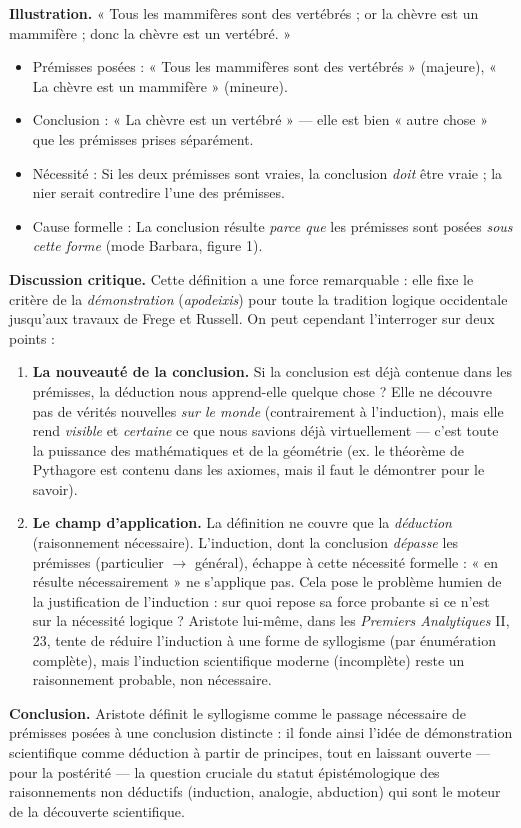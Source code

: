 \documentclass[11pt]{article}
\begin{document}
\begin{exoresolu}
\textbf{Illustration.} « Tous les mammifères sont des vertébrés ; or la chèvre est un mammifère ; donc la chèvre est un vertébré. »
\begin{itemize}
\item Prémisses posées : « Tous les mammifères sont des vertébrés » (majeure), « La chèvre est un mammifère » (mineure).
\item Conclusion : « La chèvre est un vertébré » — elle est bien « autre chose » que les prémisses prises séparément.
\item Nécessité : Si les deux prémisses sont vraies, la conclusion \emph{doit} être vraie ; la nier serait contredire l'une des prémisses.
\item Cause formelle : La conclusion résulte \emph{parce que} les prémisses sont posées \emph{sous cette forme} (mode Barbara, figure 1).
\end{itemize}

\textbf{Discussion critique.}
Cette définition a une force remarquable : elle fixe le critère de la \emph{démonstration} (\emph{apodeixis}) pour toute la tradition logique occidentale jusqu'aux travaux de Frege et Russell.
On peut cependant l'interroger sur deux points :
\begin{enumerate}
\item \textbf{La nouveauté de la conclusion.} Si la conclusion est déjà contenue dans les prémisses, la déduction nous apprend-elle quelque chose ? Elle ne découvre pas de vérités nouvelles \emph{sur le monde} (contrairement à l'induction), mais elle rend \emph{visible} et \emph{certaine} ce que nous savions déjà virtuellement — c'est toute la puissance des mathématiques et de la géométrie (ex. le théorème de Pythagore est contenu dans les axiomes, mais il faut le démontrer pour le savoir).
\item \textbf{Le champ d'application.} La définition ne couvre que la \emph{déduction} (raisonnement nécessaire). L'induction, dont la conclusion \emph{dépasse} les prémisses (particulier $\rightarrow$ général), échappe à cette nécessité formelle : « en résulte nécessairement » ne s'applique pas. Cela pose le problème humien de la justification de l'induction : sur quoi repose sa force probante si ce n'est sur la nécessité logique ? Aristote lui-même, dans les \emph{Premiers Analytiques} II, 23, tente de réduire l'induction à une forme de syllogisme (par énumération complète), mais l'induction scientifique moderne (incomplète) reste un raisonnement probable, non nécessaire.
\end{enumerate}

\textbf{Conclusion.} Aristote définit le syllogisme comme le passage nécessaire de prémisses posées à une conclusion distincte : il fonde ainsi l'idée de démonstration scientifique comme déduction à partir de principes, tout en laissant ouverte — pour la postérité — la question cruciale du statut épistémologique des raisonnements non déductifs (induction, analogie, abduction) qui sont le moteur de la découverte scientifique.
\end{exoresolu}
\end{document}
